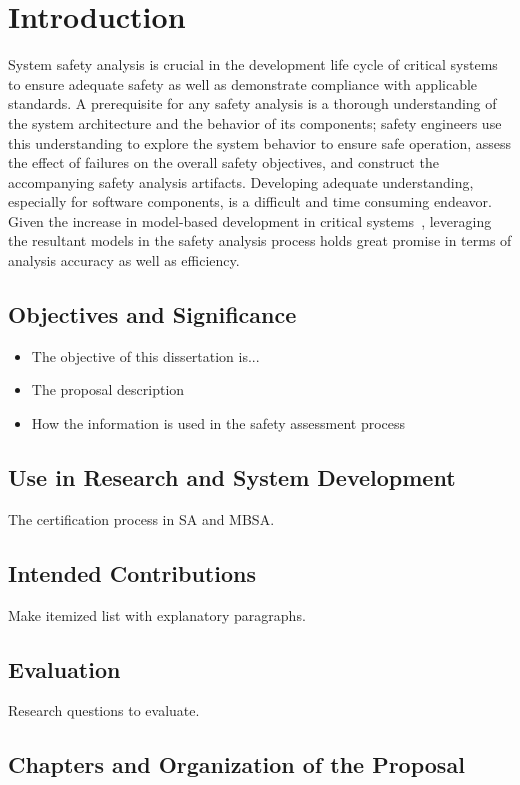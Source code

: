 \chapter{Introduction}
\label{chap:intro}

System safety analysis is crucial in the development life cycle of critical systems to ensure adequate safety as well as demonstrate compliance with applicable standards. A prerequisite for any safety analysis is a thorough understanding of the system architecture and the behavior of its components; safety engineers use this understanding to explore the system behavior to ensure safe operation, assess the effect of failures on the overall safety objectives, and construct the accompanying safety analysis artifacts. Developing adequate understanding, especially for software components, is a difficult and time consuming endeavor. Given the increase in model-based development in critical systems~\cite{Joshi05:Dasc,CAV2015:BoCiGrMa,info17:HaLuHo,5979344,Gudemann:2010:FQQ:1909626.1909813}, leveraging the resultant models in the safety analysis process holds great promise in terms of analysis accuracy as well as efficiency.

\section{Objectives and Significance}
\begin{itemize}
\item The objective of this dissertation is...
\item The proposal description
\item How the information is used in the safety assessment process
\end{itemize}

\section{Use in Research and System Development}
The certification process in SA and MBSA.

\section{Intended Contributions}
Make itemized list with explanatory paragraphs.

\section{Evaluation}
Research questions to evaluate.

\section{Chapters and Organization of the Proposal}


